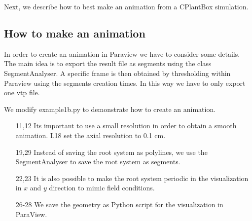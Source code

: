 Next, we describe how to best make an animation from a CPlantBox simulation.


\subsection{How to make an animation} \label{ssec:animation}

In order to create an animation in Paraview we have to consider some details. The main idea is to export the result file as segments using the class SegmentAnalyser. A specific frame is then obtained by thresholding within Paraview using the segments creation times. In this way we have to only export one vtp file. 

We modify example1b.py to demonstrate how to create an animation.

 

\begin{itemize}

\item[11,12] Its important to use a small resolution in order to obtain a smooth animation. L18 set the axial resolution to 0.1 cm. 

\item[19,29] Instead of saving the root system as polylines, we use the SegmentAnalyser to save the root system as segments.

\item[22,23] It is also possible to make the root system periodic in the visualization in $x$ and $y$ direction to mimic field conditions.

\item[26-28] We save the geometry as Python script for the visualization in ParaView.

\end{itemize}

